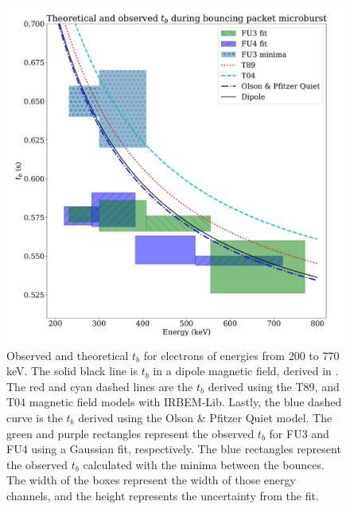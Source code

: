 \documentclass[draft, linenumbers]{agujournal}
\begin{document}
\begin{figure}
\includegraphics[width=\textwidth]{detrended_bounce_period_boxed_adj.pdf}
\caption{Observed and theoretical $t_b$ for electrons of energies from 200 to 770 keV. The solid black line is $t_b$ in a dipole magnetic field, derived in \citet{Schulz1974}. The red and cyan dashed lines are the $t_b$ derived using the T89, and T04 magnetic field models with IRBEM-Lib. Lastly, the blue dashed curve is the $t_b$ derived using the Olson \& Pfitzer Quiet model. The green and purple rectangles represent the observed $t_b$ for FU3 and FU4 using a Gaussian fit, respectively. The blue rectangles represent the observed $t_b$ calculated with the minima between the bounces. The width of the boxes represent the width of those energy channels, and the height represents the uncertainty from the fit.}
\label{tb_plot}
\end{figure}
\end{document}
